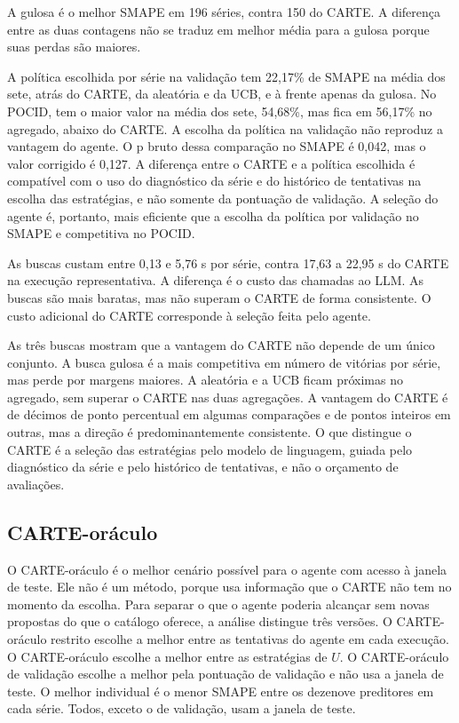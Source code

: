 A gulosa é o melhor SMAPE em 196 séries, contra 150 do CARTE. A diferença entre as duas contagens não se traduz em melhor média para a gulosa porque suas perdas são maiores.

A política escolhida por série na validação tem 22,17\% de SMAPE na média dos sete, atrás do CARTE, da aleatória e da UCB, e à frente apenas da gulosa. No POCID, tem o maior valor na média dos sete, 54,68\%, mas fica em 56,17\% no agregado, abaixo do CARTE. A escolha da política na validação não reproduz a vantagem do agente. O p bruto dessa comparação no SMAPE é 0,042, mas o valor corrigido é 0,127. A diferença entre o CARTE e a política escolhida é compatível com o uso do diagnóstico da série e do histórico de tentativas na escolha das estratégias, e não somente da pontuação de validação. A seleção do agente é, portanto, mais eficiente que a escolha da política por validação no SMAPE e competitiva no POCID.

As buscas custam entre 0,13 e 5,76 s por série, contra 17,63 a 22,95 s do CARTE na execução representativa. A diferença é o custo das chamadas ao LLM. As buscas são mais baratas, mas não superam o CARTE de forma consistente. O custo adicional do CARTE corresponde à seleção feita pelo agente.

As três buscas mostram que a vantagem do CARTE não depende de um único conjunto. A busca gulosa é a mais competitiva em número de vitórias por série, mas perde por margens maiores. A aleatória e a UCB ficam próximas no agregado, sem superar o CARTE nas duas agregações. A vantagem do CARTE é de décimos de ponto percentual em algumas comparações e de pontos inteiros em outras, mas a direção é predominantemente consistente. O que distingue o CARTE é a seleção das estratégias pelo modelo de linguagem, guiada pelo diagnóstico da série e pelo histórico de tentativas, e não o orçamento de avaliações.

\subsection{CARTE-oráculo} \label{subsec:carte-oraculo}

O CARTE-oráculo é o melhor cenário possível para o agente com acesso à janela de teste. Ele não é um método, porque usa informação que o CARTE não tem no momento da escolha. Para separar o que o agente poderia alcançar sem novas propostas do que o catálogo oferece, a análise distingue três versões. O CARTE-oráculo restrito escolhe a melhor entre as tentativas do agente em cada execução. O CARTE-oráculo escolhe a melhor entre as estratégias de $U$. O CARTE-oráculo de validação escolhe a melhor pela pontuação de validação e não usa a janela de teste. O melhor individual é o menor SMAPE entre os dezenove preditores em cada série. Todos, exceto o de validação, usam a janela de teste.

